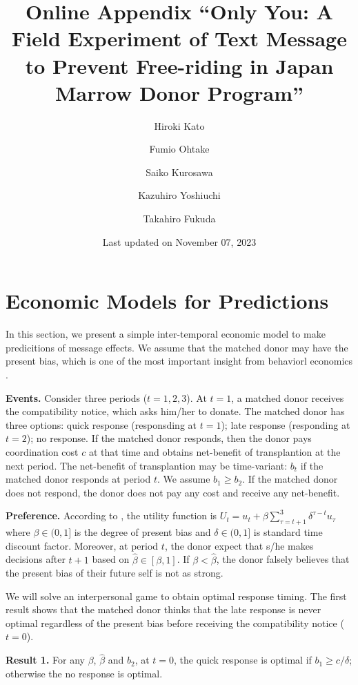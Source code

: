 \documentclass[
]{article}
\title{Online Appendix
``Only You: A Field Experiment of Text Message to Prevent Free-riding in Japan Marrow Donor Program''}
\author{Hiroki Kato \and Fumio Ohtake \and Saiko Kurosawa \and Kazuhiro Yoshiuchi \and Takahiro Fukuda}
\date{Last updated on November 07, 2023}
\begin{document}
\maketitle

{
\setcounter{tocdepth}{2}
\tableofcontents
}
\hypertarget{economic-models-for-predictions}{%
\section{Economic Models for Predictions}\label{economic-models-for-predictions}}

In this section, we present a simple inter-temporal economic model to make predicitions of message effects. We assume that the matched donor may have the present bias, which is one of the most important insight from behaviorl economics \citep{Laibson1997, ODonoghue2001}.

\noindent
\textbf{Events.} Consider three periods (\(t = 1, 2, 3\)). At \(t=1\), a matched donor receives the compatibility notice, which asks him/her to donate. The matched donor has three options: quick response (responsding at \(t=1\)); late response (responding at \(t=2\)); no response. If the matched donor responds, then the donor pays coordination cost \(c\) at that time and obtains net-benefit of transplantion at the next period. The net-benefit of transplantion may be time-variant: \(b_t\) if the matched donor responds at period \(t\). We assume \(b_1 \ge b_2\). If the matched donor does not respond, the donor does not pay any cost and receive any net-benefit.

\noindent
\textbf{Preference.} According to \citet{Laibson1997}, the utility function is \(U_t = u_t + \beta \sum_{\tau = t + 1}^{3} \delta^{\tau - t} u_{\tau}\) where \(\beta \in (0, 1]\) is the degree of present bias and \(\delta \in (0, 1]\) is standard time discount factor. Moreover, at period \(t\), the donor expect that s/he makes decisions after \(t + 1\) based on \(\hat{\beta} \in [\beta, 1]\). If \(\beta < \hat{\beta}\), the donor falsely believes that the present bias of their future self is not as strong.

We will solve an interpersonal game \citep{ODonoghue2001} to obtain optimal response timing. The first result shows that the matched donor thinks that the late response is never optimal regardless of the present bias before receiving the compatibility notice (\(t=0\)).

\noindent
\textbf{Result 1.} For any \(\beta\), \(\hat{\beta}\) and \(b_2\), at \(t = 0\), the quick response is optimal if \(b_1 \ge c/\delta\); otherwise the no response is optimal.
\end{document}
